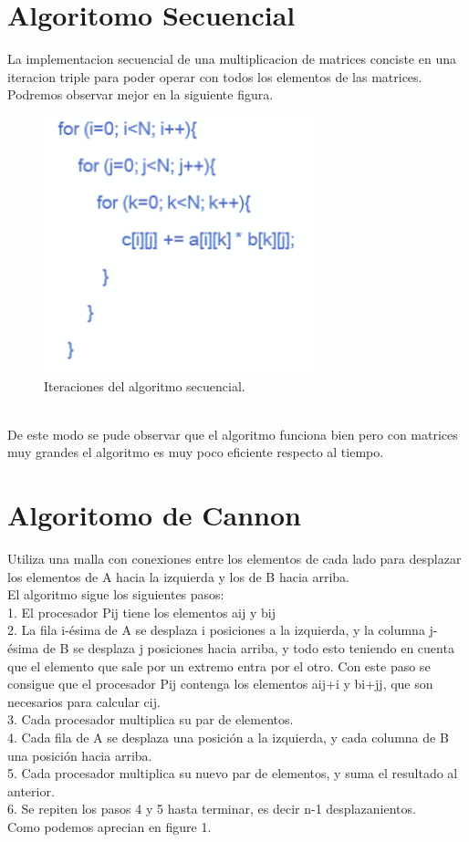 \documentclass[12pt]{article}
\begin{document}
\begin{titlepage}
\section*{Algoritomo Secuencial}
La implementacion secuencial de una multiplicacion de matrices conciste en una iteracion triple para poder operar con todos los elementos de las matrices.
Podremos observar mejor en la siguiente figura.
\begin{figure}[htb]
\centering
\includegraphics[width=0.7\textwidth]{secuencial.png}
\caption{Iteraciones del algoritmo secuencial. }
\end{figure}\\
De este modo se pude observar que el algoritmo funciona bien pero con matrices muy grandes el algoritmo es muy poco eficiente respecto al tiempo.

\section*{Algoritomo de Cannon}
Utiliza una malla con conexiones entre los elementos de cada lado para desplazar los elementos de A hacia la izquierda y los de B hacia arriba.\\
El algoritmo sigue los siguientes pasos:\\
	1. El procesador Pij tiene los elementos aij y bij\\
	2. La fila i-ésima de A se desplaza i posiciones a la izquierda, y la columna j-		ésima de B se desplaza j posiciones hacia arriba, y todo esto teniendo en cuenta 		que el elemento que sale por un extremo entra por el otro. Con este paso se 			consigue que el procesador Pij contenga los elementos aij+i y bi+jj, que son 			necesarios para calcular cij.\\
	3. Cada procesador multiplica su par de elementos.\\
	4. Cada fila de A se desplaza una posición a la izquierda, y cada columna de B una posición hacia arriba.\\
	5. Cada procesador multiplica su nuevo par de elementos, y suma el resultado al anterior.\\
	6. Se repiten los pasos 4 y 5 hasta terminar, es decir n-1 desplazanientos.\\
	Como podemos aprecian en figure 1.


\end{titlepage}
\end{document}
